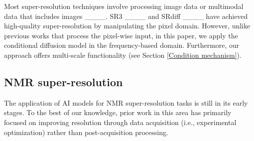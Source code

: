 

Most super-resolution techniques involve processing image data or multimodal data that includes images ____. SR3 ____ and SRdiff ____ have achieved high-quality super-resolution by manipulating the pixel domain. 
However, unlike previous works that process the pixel-wise input, in this paper, we apply the conditional diffusion model in the frequency-based domain. Furthermore, our approach offers multi-scale functionality (see Section \ref{Condition mechanism}).

\subsection{NMR super-resolution}\label{nmr super-reso}

The application of AI models for NMR super-resolution tasks is still in its early stages. To the best of our knowledge, prior work in this area has primarily focused on improving resolution through data acquisition (i.e., experimental optimization) rather than post-acquisition processing.

